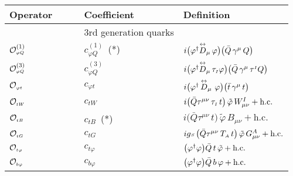 \begin{table}[htbp]
  \begin{center}
    \renewcommand{\arraystretch}{1.45}
    \begin{tabular}{lll}
      \toprule
      Operator $\qquad$ & Coefficient & Definition \\
                \midrule \midrule
		&3rd generation quarks&\\
                \midrule \midrule
    $\mathcal{O}_{\scriptscriptstyle \varphi Q}^{(1)}$ & $c_{\varphi Q}^{(1)}$~(*) & $i\big(\varphi^\dagger\overset{\text{\scriptsize$\leftrightarrow$}}{D}_\mu\,\varphi\big)
 \big(\bar{Q}\,\gamma^\mu\,Q\big)$ \\\hline
    $\mathcal{O}_{\scriptscriptstyle \varphi Q}^{(3)}$ & $c_{\varphi Q}^{(3)}$  & $i\big(\varphi^\dagger\overset{\text{\scriptsize$\leftrightarrow$}}{D}_\mu\,\tau_{\scriptscriptstyle I}\varphi\big)
 \big(\bar{Q}\,\gamma^\mu\,\tau^{\scriptscriptstyle I}Q\big)$ \\ \hline
    $\mathcal{O}_{\scriptscriptstyle \varphi t}$ & $c_{\varphi t}$& $i\big(\varphi^\dagger\,\overset{\text{\scriptsize$\leftrightarrow$}}{D}_\mu\,\,\varphi\big)
 \big(\bar{t}\,\gamma^\mu\,t\big)$ \\ \hline
      $\mathcal{O}_{\scriptscriptstyle tW}$ & $c_{tW}$ & $i\big(\bar{Q}\tau^{\mu\nu}\,\tau_{\scriptscriptstyle I}\,t\big)\,
 \tilde{\varphi}\,W^I_{\mu\nu}
 + \text{h.c.}$ \\  \hline
 $\mathcal{O}_{\scriptscriptstyle tB}$ & $c_{tB}$~(*) &
 $i\big(\bar{Q}\tau^{\mu\nu}\,t\big)
 \,\tilde{\varphi}\,B_{\mu\nu}
 + \text{h.c.}$ \\\hline
    $\mathcal{O}_{\scriptscriptstyle t G}$ & $c_{tG}$ & $ig{\scriptscriptstyle S}\,\big(\bar{Q}\tau^{\mu\nu}\,T_{\scriptscriptstyle A}\,t\big)\,
 \tilde{\varphi}\,G^A_{\mu\nu}
 + \text{h.c.}$ \\  \hline
    $\mathcal{O}_{\scriptscriptstyle t \varphi}$ & $c_{t\varphi}$ & $\left(\pdp\right)
 \bar{Q}\,t\,\tilde{\varphi} + \text{h.c.}$  \\\hline
    $\mathcal{O}_{\scriptscriptstyle b \varphi}$ & $c_{b\varphi}$ & $\left(\pdp\right)
 \bar{Q}\,b\,\varphi + \text{h.c.}$ \\

\end{tabular}
\end{center}
\end{table}
